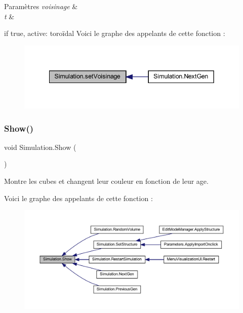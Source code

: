\begin{DoxyParams}{Paramètres}
{\em voisinage} & \\
\hline
{\em t} & \\
\hline
\end{DoxyParams}
if true, active\+: toroïdal Voici le graphe des appelants de cette fonction \+:
\nopagebreak
\begin{figure}[H]
\begin{center}
\leavevmode
\includegraphics[width=342pt]{class_simulation_a9238f4dcd56a4945017fda48a76a3dc8_icgraph}
\end{center}
\end{figure}
\mbox{\label{class_simulation_af5fd57d6f657f07bc0fac7085832dc82}} 
\subsubsection{\texorpdfstring{Show()}{Show()}}
{\footnotesize\ttfamily void Simulation.\+Show (\begin{DoxyParamCaption}{ }\end{DoxyParamCaption})\hspace{0.3cm}{\ttfamily [inline]}}



Montre les cubes et changent leur couleur en fonction de leur age. 

Voici le graphe des appelants de cette fonction \+:
\nopagebreak
\begin{figure}[H]
\begin{center}
\leavevmode
\includegraphics[width=350pt]{class_simulation_af5fd57d6f657f07bc0fac7085832dc82_icgraph}
\end{center}
\end{figure}
\mbox{\label{class_simulation_acc3c641f3874f1805c3a13d2153b6023}} 
